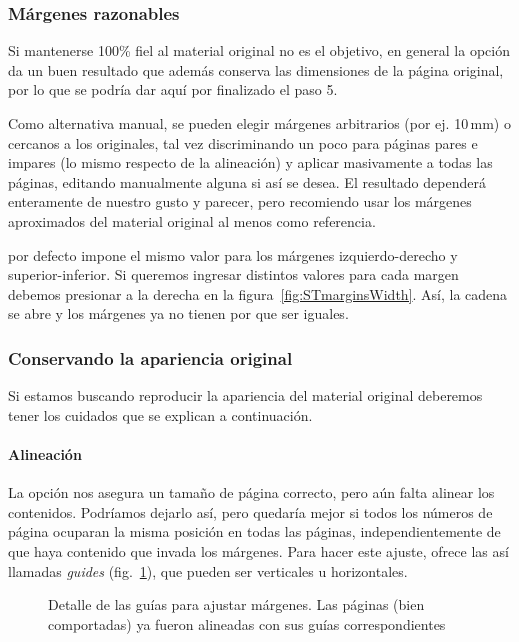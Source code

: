 \documentclass[%
	a5paper,
	10pt,
	twoside,
	openright,
	final,
]{memoir}
\begin{document}
{	\subsubsection{Márgenes razonables\label{sec:STmarginsReasonables}} Si mantenerse 100\% fiel al material original no es el objetivo, en general la opción  da un buen resultado que además conserva las dimensiones de la página original, por lo que se podría dar aquí por finalizado el paso 5.

	Como alternativa manual, se pueden elegir márgenes arbitrarios (por ej. 10\,mm) o cercanos a los originales, tal vez discriminando un poco para páginas pares e impares (lo mismo respecto de la alineación) y aplicar masivamente a todas las páginas, editando manualmente alguna si así se desea. El resultado dependerá enteramente de nuestro gusto y parecer, pero recomiendo usar los márgenes aproximados del material original al menos como referencia.

	\scantailor por defecto impone el mismo valor para los márgenes izquierdo-derecho y superior-inferior. Si queremos ingresar distintos valores para cada margen debemos presionar \keys{\faLink} a la derecha en la figura~\ref{fig:STmarginsWidth}. Así, la cadena se abre \keys{\faUnlink} y los márgenes ya no tienen por que ser iguales.

	\subsubsection{Conservando la apariencia original\label{sec:STmarginsOriginals}} Si estamos buscando reproducir la apariencia del material original deberemos tener los cuidados que se explican a continuación.

	\paragraph{Alineación} La opción  nos asegura un tamaño de página correcto, pero aún falta alinear los contenidos. Podríamos dejarlo así, pero quedaría mejor si todos los números de página ocuparan la misma posición en todas las páginas, independientemente de que haya contenido que invada los márgenes. Para hacer este ajuste, \scantailorAdvanced ofrece las así llamadas \emph{guides} (fig.~\ref{fig:STmarginsGuides}), que pueden ser verticales u horizontales.

	\begin{figure}
		\tiny
		\def\svgwidth{\linewidth}
		\def\svgwidth{\linewidth}
		\caption[Detalle de las guías para ajustar márgenes]{Detalle de las guías para ajustar márgenes. Las páginas (bien comportadas) ya fueron alineadas con sus guías correspondientes\label{fig:STmarginsGuides}}
	\end{figure}

}
\end{document}
